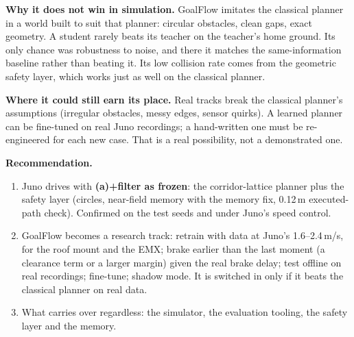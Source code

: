 \documentclass[11pt,a4paper]{article}
\begin{document}
\textbf{Why it does not win in simulation.} GoalFlow imitates the classical planner in a world built to suit that
planner: circular obstacles, clean gaps, exact geometry. A student rarely beats its teacher on the teacher's home
ground. Its only chance was robustness to noise, and there it matches the same-information baseline rather than
beating it. Its low collision rate comes from the geometric safety layer, which works just as well on the
classical planner.

\textbf{Where it could still earn its place.} Real tracks break the classical planner's assumptions (irregular
obstacles, messy edges, sensor quirks). A learned planner can be fine-tuned on real Juno recordings; a hand-written
one must be re-engineered for each new case. That is a real possibility, not a demonstrated one.

\textbf{Recommendation.}
\begin{enumerate}[nosep]
  \item Juno drives with \textbf{(a)+filter as frozen}: the corridor-lattice planner plus the safety layer (circles,
        near-field memory with the memory fix, 0.12\,m executed-path check). Confirmed on the test seeds and under
        Juno's speed control.
  \item GoalFlow becomes a research track: retrain with data at Juno's 1.6--2.4\,m/s, for the roof mount and the EMX;
        brake earlier than the last moment (a clearance term or a larger margin) given the real brake delay; test offline
        on real recordings; fine-tune; shadow mode. It is switched in only if it beats the classical planner on real data.
  \item What carries over regardless: the simulator, the evaluation tooling, the safety layer and the memory.
\end{enumerate}

\end{document}
